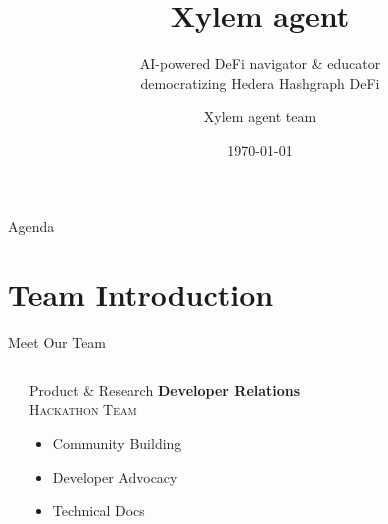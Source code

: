 \documentclass[aspectratio=169]{beamer}
\title{Xylem agent}
\subtitle{AI-powered DeFi navigator \& educator \\ democratizing Hedera Hashgraph DeFi}
\author{Xylem agent team}
\institute{Hello Future Hackathon}
\date{\today}
\begin{document}
\begin{frame}
\titlepage
\end{frame}

\begin{frame}{Agenda}
\tableofcontents
\end{frame}

\section{Team Introduction}

\begin{frame}{Meet Our Team}
\vspace{0.05cm}
\begin{columns}[c]
\begin{center}
\end{center}

\vspace{0.05cm}

\begin{block}{Product \& Research}
\centering
\vspace{0.05cm}
\textbf{\normalsize \color{secondary}Developer Relations} \\
\vspace{0.05cm}
\textsc{\normalsize Hackathon Team} \\
\vspace{0.05cm}
\begin{itemize}
\setlength\itemsep{0em}
\setlength\leftmargin{1em}
\item Community Building
\item Developer Advocacy  
\item Technical Docs
\end{itemize}
\vspace{0.05cm}
\end{block}


\begin{center}
\end{center}


\end{columns}
\end{frame}
\end{document}
